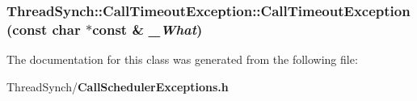 \subsubsection{\setlength{\rightskip}{0pt plus 5cm}Thread\-Synch::Call\-Timeout\-Exception::Call\-Timeout\-Exception (const char $\ast$const \& {\em \_\-What})\hspace{0.3cm}{\tt  [inline]}}\label{class_thread_synch_1_1_call_timeout_exception_afbcc3c79fc51b5ec8597a0d4f50973c}




The documentation for this class was generated from the following file:\begin{CompactItemize}
\item 
Thread\-Synch/{\bf Call\-Scheduler\-Exceptions.h}\end{CompactItemize}
